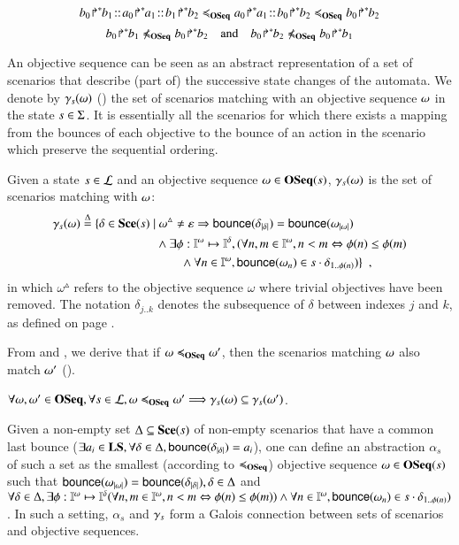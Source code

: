 \begin{example}
\[\obj{b_0}{b_1}\concat\obj{a_0}{a_1}\concat\obj{b_1}{b_2}
\ltw
\obj{a_0}{a_1}\concat\obj{b_0}{b_2}
\ltw
\obj{b_0}{b_2}\]
\[\obj{b_0}{b_1}\not\ltw\obj{b_0}{b_2}
\quad\text{and}\quad
\obj{b_0}{b_2}\not\ltw\obj{b_0}{b_1}\]
\end{example}

An objective sequence can be seen as an abstract representation of a set of scenarios that describe
(part of) the successive state changes of the automata.
We denote by $\gamma_s(\omega)$ () the set of scenarios matching with an objective sequence
$\omega$ in the state $s\in\Sigma$.
It is essentially all the scenarios for which there exists a mapping from the bounces of each
objective to the bounce of an action in the scenario which preserve the sequential ordering.

\begin{definition}[$\concr: \OS \to \powerset(\Sce)$]\label{def:concr}
Given a state $s\in\mathcal{L}$ and an objective sequence
$\omega\in\mathbf{OSeq}(s)$, $\gamma_s(\omega)$ is the set of scenarios matching with $\omega$:
\begin{align*}
\concr(\w) \DEF \{ \delta\in\Sce(s)\mid &\ 
\w^\vartriangle\neq \emptyseq\Rightarrow
\bounce{\delta_{\card\delta}} = \bounce{\w_{\card\w}}
\\ &
 \wedge \exists \phi:\indexes{\w}\mapsto\indexes{\delta},
    (\forall n,m\in\indexes{\w}, n<m \Leftrightarrow \phi(n)\leq\phi(m)
\\ & \qquad
	\wedge \forall n\in\indexes{\w},
	  \bounce{\w_n} \in s\play\delta_{1..\phi(n)})
\}
\enspace,
\end{align*}
in which $\omega^\vartriangle$ refers to the objective sequence $\omega$ where
trivial objectives have been removed.
The notation $\delta_{j..k}$
denotes the subsequence of $\delta$ between indexes $j$ and $k$,
as defined on page \pageref{notations}.
\end{definition}

From  and , we derive that if
$\omega \preccurlyeq_{\mathbf{OSeq}} \omega'$, then the scenarios matching $\omega$ also match $\omega'$ ().
\begin{lemma}\label{lem:ltw}
$\forall \omega, \omega' \in \mathbf{OSeq}, \forall s \in \mathcal{L},
\omega\preccurlyeq_{\mathbf{OSeq}}\omega' \Longrightarrow \gamma_s(\omega)\subseteq\gamma_s(\omega')$\enspace.
\end{lemma}

Given a non-empty set $\Delta\subseteq\mathbf{Sce}(s)$ of non-empty scenarios that have a common last bounce
($\exists a_i\in\mathbf{LS}, \forall\delta\in\Delta,
\mathsf{bounce}(\delta_{|\delta|})=a_i$), one can define an abstraction $\alpha_s$ of
such a set as the smallest (according to $\preccurlyeq_{\mathbf{OSeq}}$) objective sequence $\omega\in\mathbf{OSeq}(s)$ such that
$\mathsf{bounce}(\omega_{|\omega|}) = \mathsf{bounce}(\delta_{|\delta|}), \delta\in\Delta$
and
$\forall\delta\in\Delta, \exists \phi:\mathbb{I}^{\omega}\mapsto\mathbb{I}^{\delta}
    (\forall n,m\in\mathbb{I}^{\omega}, n<m \Leftrightarrow \phi(n)\leq\phi(m))
	\wedge \forall n\in\mathbb{I}^{\omega},
	  \mathsf{bounce}(\omega_n) \in s\cdot\delta_{1..\phi(n)})$.
In such a setting, $\alpha_s$ and $\gamma_s$ form a Galois connection between sets
of scenarios and objective sequences.


